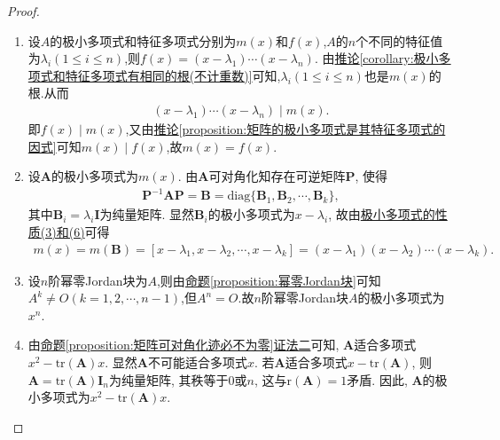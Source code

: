 \documentclass[../../main.tex]{subfiles}
\begin{document}
\begin{proof}
\begin{enumerate}[(1)]
\item 设$A$的极小多项式和特征多项式分别为$m(x)$和$f(x)$,$A$的$n$个不同的特征值为$\lambda_i(1\leq i\leq n)$,则$f(x)=(x-\lambda_1)\cdots(x-\lambda_n)$.
由\hyperref[corollary:极小多项式和特征多项式有相同的根(不计重数)]{推论\ref{corollary:极小多项式和特征多项式有相同的根(不计重数)}}可知,$\lambda_i(1\leq i\leq n)$也是$m(x)$的根.从而
\begin{align*}
(x-\lambda_1)\cdots(x-\lambda_n)\mid m(x).
\end{align*}
即$f(x)\mid m(x)$,又由\hyperref[proposition:矩阵的极小多项式是其特征多项式的因式]{推论\ref{proposition:矩阵的极小多项式是其特征多项式的因式}}可知$m(x)\mid f(x)$,故$m(x)=f(x)$.

\item 设\(\boldsymbol{A}\)的极小多项式为\(m(x)\). 由\(\boldsymbol{A}\)可对角化知存在可逆矩阵\(\boldsymbol{P}\), 使得
\begin{align*}
\boldsymbol{P}^{-1}\boldsymbol{A}\boldsymbol{P} = \boldsymbol{B} = \mathrm{diag}\{\boldsymbol{B}_1,\boldsymbol{B}_2,\cdots,\boldsymbol{B}_k\},
\end{align*}
其中\(\boldsymbol{B}_i = \lambda_i\boldsymbol{I}\)为纯量矩阵. 显然\(\boldsymbol{B}_i\)的极小多项式为\(x - \lambda_i\), 故由\hyperref[proposition:极小多项式的性质]{极小多项式的性质(3)和(6)}可得
\begin{align*}
m(x) = m(\boldsymbol{B})= [x - \lambda_1,x - \lambda_2,\cdots,x - \lambda_k] = (x - \lambda_1)(x - \lambda_2)\cdots(x - \lambda_k). 
\end{align*} 

\item 设\(n\)阶幂零Jordan块为$A$,则由\hyperref[proposition:幂零Jordan块]{命题\ref{proposition:幂零Jordan块}}可知$A^k\ne O(k=1,2,\cdots,n-1)$,但$A^n=O$.故\(n\)阶幂零Jordan块$A$的极小多项式为$x^n$.

\item 由\hyperref[proposition:矩阵可对角化迹必不为零]{命题\ref{proposition:矩阵可对角化迹必不为零}证法二}可知, \(\boldsymbol{A}\)适合多项式\(x^2 - \mathrm{tr}(\boldsymbol{A})x\). 显然\(\boldsymbol{A}\)不可能适合多项式\(x\). 若\(\boldsymbol{A}\)适合多项式\(x - \mathrm{tr}(\boldsymbol{A})\), 则\(\boldsymbol{A} = \mathrm{tr}(\boldsymbol{A})\boldsymbol{I}_n\)为纯量矩阵, 其秩等于\(0\)或\(n\), 这与\(\mathrm{r}(\boldsymbol{A}) = 1\)矛盾. 因此, \(\boldsymbol{A}\)的极小多项式为\(x^2 - \mathrm{tr}(\boldsymbol{A})x\). 
\end{enumerate}
\end{proof}
\end{document}
